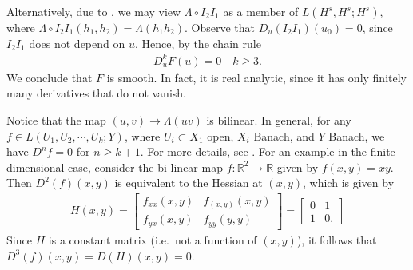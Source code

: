 \documentclass[12pt,reqno]{amsart}
\numberwithin{equation}{section}  %
\newcommand{\rr}{\mathbb{R}}
\renewcommand{\cref}{\Cref} %
\begin{document}
%
Alternatively, due to \cref{lem:iso}, we may view $\Lambda \circ I_{2} I_{1}$ as
a member of $L(H^{s}, H^{s}; H^{s})$, where $\Lambda \circ I_{2} I_{1}(h_{1},
h_{2}) = \Lambda (h_{1}h_{2})$. Observe that $D_{u}(I_{2} I_{1})(u_{0}) = 0$, since $I_{2} I_{1}$ does not depend on $u$. Hence, by the
chain rule
%
%
\begin{equation*}
\begin{split}
D^{k}_{u} F(u) = 0 \quad k \ge 3.
\end{split}
\end{equation*}
%
%
%
We conclude that $F$ is smooth. In fact, it is real analytic, since it has only
finitely many derivatives that do not vanish. 
%
%
\begin{framed}
Notice that the map $(u, v) \to \Lambda (uv)$ is bilinear. In general, for
any $f \in L(U_{1}, U_{2}, \cdots, U_{k}; Y)$, where $U_{i} \subset X_{1}$
open, $X_{i}$ Banach, and $Y$ Banach, we have $D^{n}f = 0$ for $n \ge k+1$.
For more details, see \cite{Dieudonne_1969_Foundations-of-}. For an 
example in the finite dimensional case, consider the bi-linear map $f: \rr^{2} \to \rr$ given by $f(x, y) = xy$. Then $D^{2}(f)(x,y)$ is equivalent to the Hessian at $(x,y)$, which is given by
%
%
\begin{equation*}
\begin{split}
H(x,y) = 
\begin{bmatrix}
f_{xx}(x,y) & f_{(x,y)}(x,y)
\\
f_{yx}(x,y) & f_{yy}(y,y)
\end{bmatrix}
= 
\begin{bmatrix}
0 & 1 
\\
1 & 0. 
\end{bmatrix}
\end{split}
\end{equation*}
%
Since $H$ is a constant matrix (i.e.\ not a function of $(x,y)$), it follows
that $D^{3}(f)(x,y) = D(H)(x,y) = 0$. 
%
\end{framed}
\end{document}

